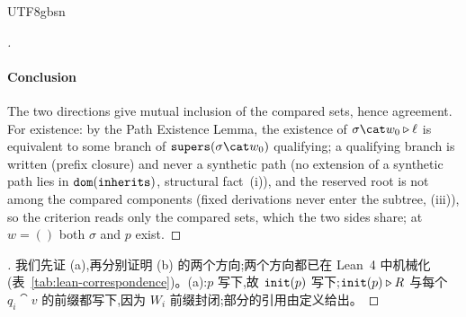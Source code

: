 \begin{CJK*}{UTF8}{gbsn}
\begin{proof}[]
  \paragraph{Conclusion}
  The two directions give mutual inclusion of the compared sets,
  hence agreement. For existence: by the Path Existence Lemma, the
  existence of $\sigma \cat w_0 \snoc \ell$ is equivalent to some
  branch of $\supers(\sigma \cat w_0)$ qualifying; a qualifying
  branch is written (prefix closure) and never a synthetic path (no
  extension of a synthetic path lies in $\mathtt{dom}(\mathtt{inherits})$,
  structural fact~(i)), and the reserved root is not among the
  compared components (fixed derivations never enter the subtree,
  (iii)), so the criterion reads only the compared sets, which the
  two sides share; at $w = ()$ both $\sigma$ and $p$ exist.
\fi
\end{proof}




\begin{proof}[]
\ifPaperChinese
\begin{sloppypar}
我们先证 (a),再分别证明 (b) 的两个方向;两个方向都已在 Lean~4 中机械化(表~\ref{tab:lean-correspondence})。(a):$p$ 写下,故 $\mathtt{init}(p)$ 写下;$\mathtt{init}(p) \mathbin{\triangleright} R$ 与每个 $q_i \cat v$ 的前缀都写下,因为 $W_i$ 前缀封闭;部分的引用由定义给出。


\end{sloppypar}
\end{proof}
\end{CJK*}
